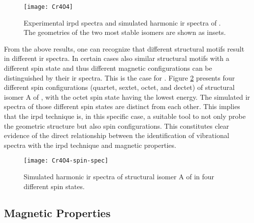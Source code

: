 \begin{refsection}
\begin{figure}[htb!]
	\centering
	\texttt{[image: Cr4O4]}
	\caption{Experimental \acrshort{irpd} spectra and simulated harmonic \acrshort{ir} spectra of . The geometries of the two most stable isomers are shown as insets.}
	\label{fig:Cr4O4}
\end{figure}



From the above results, one can recognize that different structural motifs result in different \acrshort{ir} spectra. In certain cases also similar structural motifs with a different spin state and thus different magnetic configurations can be distinguished by their \acrshort{ir} spectra. This is the case for . Figure \ref{fig:spin-spec} presents four different spin configurations (quartet, sextet, octet, and dectet) of structural isomer A of , with the octet spin state having the lowest energy. The simulated \acrshort{ir} spectra of those different spin states are distinct from each other. This implies that the \acrshort{irpd} technique is, in this specific case, a suitable tool to not only probe the geometric structure but also spin configurations. This constitutes clear evidence of the direct relationship between the identification of vibrational spectra with the \acrshort{irpd} technique and magnetic properties.  


\begin{figure}[htb!]
	\centering
	\texttt{[image: Cr4O4-spin-spec]}
	\caption{Simulated harmonic \acrshort{ir} spectra of structural isomer A of  in four different spin states.}
	\label{fig:spin-spec}
\end{figure}




\subsection{Magnetic Properties} 


\end{refsection}
